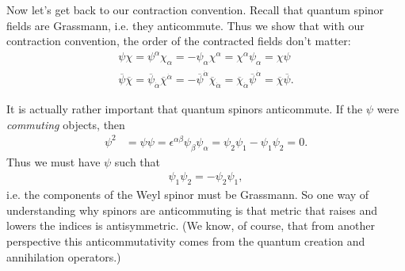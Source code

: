 \documentclass[12pt]{article}
\numberwithin{equation}{section}    %
\begin{document}
Now let's get back to our contraction convention. Recall that quantum spinor fields are Grassmann, i.e. they anticommute. Thus we show that with our contraction convention, the order of the contracted fields don't matter:
\begin{align}
	\psi\chi = \psi^\alpha\chi_\alpha = -\psi_\alpha\chi^\alpha = \chi^\alpha\psi_\alpha = \chi\psi\label{eq:SUSYalg:contractions}\\
	\overline\psi\overline\chi = \overline\psi_{\dot\alpha}\overline\chi^{\dot\alpha}= -\overline\psi^{\dot\alpha}\overline\chi_{\dot\alpha} = \overline\chi_{\dot\alpha}\overline\psi^{\dot\alpha}=\overline\chi\overline\psi.\label{eq:SUSYalg:overlinecontractions}
\end{align} 


% 
% 

It is actually rather important that quantum spinors anticommute. If the $\psi$ were \emph{commuting} objects, then
\begin{align}
	\psi^2 &= \psi\psi = \epsilon^{\alpha\beta}\psi_\beta\psi_\alpha = \psi_2\psi_1-\psi_1\psi_2 =0.
\end{align}
Thus we must have $\psi$ such that
\begin{align}
	\psi_1\psi_2 = -\psi_2\psi_1,
\end{align}
i.e. the components of the Weyl spinor must be Grassmann. 
So one way of understanding why spinors are anticommuting is that metric that raises and lowers the indices is antisymmetric. (We know, of course, that from another perspective this anticommutativity comes from the quantum creation and annihilation operators.)
\end{document}

